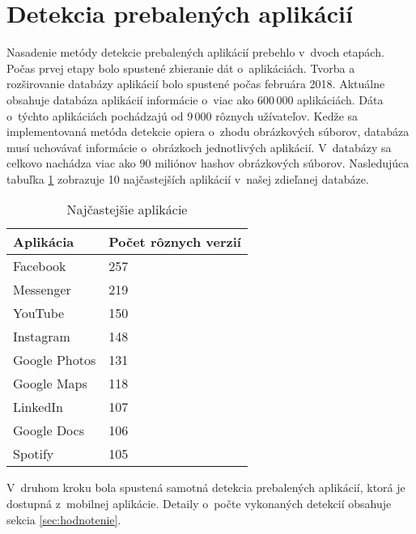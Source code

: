 \section{Detekcia prebalených aplikácií}
Nasadenie metódy detekcie prebalených aplikácií prebehlo v~dvoch etapách. Počas prvej etapy bolo spustené zbieranie dát o~aplikáciách. Tvorba a rozširovanie databázy aplikácií bolo spustené počas februára 2018. Aktuálne obsahuje databáza aplikácií informácie o~viac ako 600\,000 aplikáciách. Dáta o~týchto aplikáciách pochádzajú od 9\,000 rôznych užívateľov. Kedže sa implementovaná metóda detekcie opiera o~zhodu obrázkových súborov, databáza musí uchovávať informácie o~obrázkoch jednotlivých aplikácií. V~databázy sa celkovo nachádza viac ako 90 miliónov hashov obrázkových súborov.
Nasledujúca tabuľka \ref{apps-common} zobrazuje 10 najčastejších aplikácií v~našej zdieľanej databáze.

\begin{table}[]
\centering
\begin{tabular}{|l|l|}
\hline
Aplikácia     & Počet rôznych verzií \\ \hline
Facebook      & 257                  \\
Messenger     & 219                  \\
YouTube       & 150                   \\
Instagram     & 148                  \\
Google Photos & 131                   \\
Google Maps   & 118                   \\
LinkedIn      & 107                   \\
Google Docs   & 106                   \\ 
Spotify       & 105                   \\ \hline
\end{tabular}
\caption{Najčastejšie aplikácie}
\label{apps-common}
\end{table}

V~druhom kroku bola spustená samotná detekcia prebalených aplikácií, ktorá je dostupná z~mobilnej aplikácie. Detaily o~počte vykonaných detekcií obsahuje sekcia \ref{sec:hodnotenie}.
